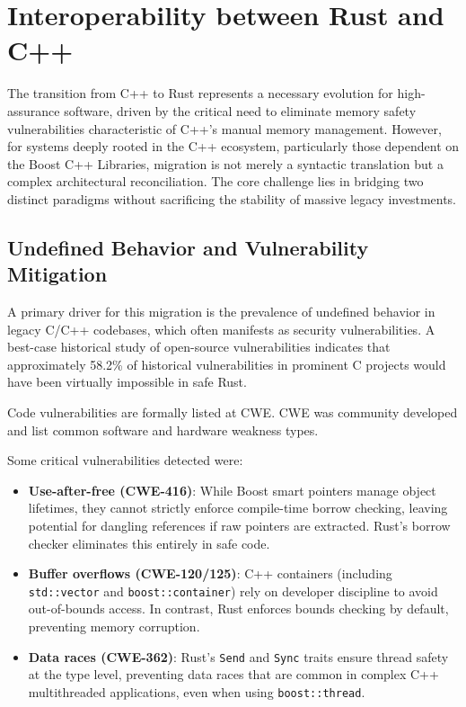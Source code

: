 \section{Interoperability between Rust and C++}

The transition from C++ to Rust represents a necessary
evolution for high-assurance software, driven by the critical
need to eliminate memory safety vulnerabilities characteristic
of C++’s manual memory management. However, for systems
deeply rooted in the C++ ecosystem, particularly those dependent on the Boost C++ Libraries, migration is not merely a
syntactic translation but a complex architectural reconciliation.
The core challenge lies in bridging two distinct paradigms
without sacrificing the stability of massive legacy investments.

\subsection{Undefined Behavior and Vulnerability Mitigation}
A primary driver for this migration is the prevalence of undefined behavior in legacy C/C++ codebases, 
which often manifests as security vulnerabilities. 
A best-case historical study of open-source vulnerabilities indicates that approximately 58.2\% of 
historical vulnerabilities 
in prominent C projects would have been virtually impossible in safe Rust. \parencite{meneely2025just} 

Code vulnerabilities are formally listed at \gls{CWE}. \gls{CWE} was community developed and list 
common software and hardware
weakness types. 

Some critical vulnerabilities detected were:

\begin{itemize}
    \item \textbf{Use-after-free (CWE-416)}: While Boost smart pointers manage object lifetimes, 
    they cannot strictly enforce compile-time borrow checking, leaving potential for dangling references 
    if raw pointers are extracted. Rust's borrow checker eliminates this entirely in safe code.
    \item \textbf{Buffer overflows (CWE-120/125)}: C++ containers (including \texttt{std::vector} and 
    \texttt{boost::container}) rely on developer discipline to avoid out-of-bounds access. 
    In contrast, Rust enforces bounds checking by default, preventing memory corruption.
    \item \textbf{Data races (CWE-362)}: Rust's \texttt{Send} and \texttt{Sync} traits ensure thread safety at the type level, 
    preventing data races that are common in complex C++ multithreaded applications, even when using \texttt{boost::thread}.
\end{itemize}

